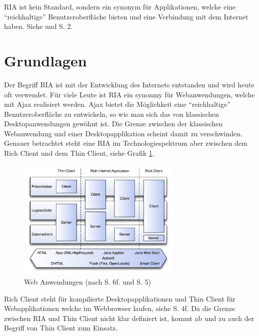   \ac{RIA} ist kein Standard, sondern ein synonym für Applikationen, welche
  eine ``reichhaltige'' Benutzeroberfläche bieten und eine Verbindung mit dem
  Internet haben. Siehe \cite{RichInternetApplication} und
  \cite{RichInternetApplicationsWhitePaper} S. 2.
  
  \section{Grundlagen}
  
  Der Begriff \ac{RIA} ist mit der Entwicklung des Internets entstanden und
  wird heute oft verwendet. Für viele Leute ist \ac{RIA} ein synonmy für
  Webanwendungen, welche mit \ac{Ajax} realisiert werden. \ac{Ajax} bietet die
  Möglichkeit eine ``reichhaltige'' Benutzeroberfläche zu entwickeln, so wie
  man sich das von klassischen Desktopanwendungen gewöhnt ist. Die Grenze
  zwischen der klassischen Webanwendung und einer Desktopapplikation scheint
  damit zu verschwinden. Genauer betrachtet steht eine \ac{RIA} im
  Technologiespektrum aber zwischen dem Rich Client und dem Thin Client, siehe
  Grafik \ref{img:webanwendungen}.
  
  \begin{figure}[h]
    \begin{center}
      \includegraphics[width=0.7\textwidth]{./image/webanwendungen.png}
      \caption{Web Anwendungen (nach \cite{DiplomarbeitStephanSchuster} S. 6f.
      und \cite{WebApplicationSolutions} S. 5)}
      \label{img:webanwendungen}
    \end{center}
  \end{figure}
  
  Rich Client steht für kompilierte Desktopapplikationen und Thin Client für
  Webapplikationen welche im Webbrowser laufen, siehe
  \cite{WebApplicationSolutions} S. 4f. Da die Grenze zwischen \ac{RIA} und
  Thin Client nicht klar definiert ist, kommt ab und zu auch der Begriff von
  Thin Client zum Einsatz.
  

